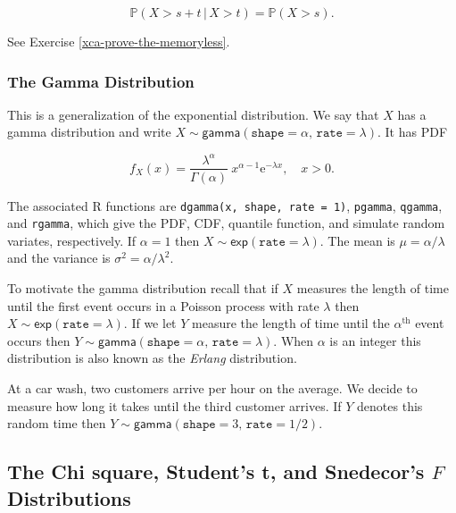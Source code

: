 \documentclass[]{book}
\numberwithin{equation}{chapter}
\numberwithin{figure}{chapter}
\theoremstyle{plain}
\theoremstyle{definition}
\theoremstyle{remark}
\theoremstyle{definition}
\theoremstyle{definition}
\theoremstyle{remark}
\let\BeginKnitrBlock\begin \let\EndKnitrBlock\end
\begin{document}
\begin{equation}
\mathbb{P}(X>s+t\,|\, X>t)=\mathbb{P}(X>s).
\end{equation}

See Exercise \ref{xca-prove-the-memoryless}.

\subsubsection{The Gamma Distribution}\label{sub-the-gamma-distribution}

This is a generalization of the exponential distribution. We say that
\(X\) has a gamma distribution and write
\(X\sim\mathsf{gamma}(\mathtt{shape}=\alpha,\,\mathtt{rate}=\lambda)\).
It has PDF

\begin{equation}
f_{X}(x)=\frac{\lambda^{\alpha}}{\Gamma(\alpha)}\: x^{\alpha-1}\mathrm{e}^{-\lambda x},\quad x>0.
\end{equation}

The associated R functions are \texttt{dgamma(x,\ shape,\ rate\ =\ 1)},
\texttt{pgamma}, \texttt{qgamma}, and \texttt{rgamma}, which give the
PDF, CDF, quantile function, and simulate random variates, respectively.
If \(\alpha=1\) then \(X\sim\mathsf{exp}(\mathtt{rate}=\lambda)\). The
mean is \(\mu=\alpha/\lambda\) and the variance is
\(\sigma^{2}=\alpha/\lambda^{2}\).

To motivate the gamma distribution recall that if \(X\) measures the
length of time until the first event occurs in a Poisson process with
rate \(\lambda\) then \(X\sim\mathsf{exp}(\mathtt{rate}=\lambda)\). If
we let \(Y\) measure the length of time until the
\(\alpha^{\mathrm{th}}\) event occurs then
\(Y\sim\mathsf{gamma}(\mathtt{shape}=\alpha,\,\mathtt{rate}=\lambda)\).
When \(\alpha\) is an integer this distribution is also known as the
\emph{Erlang} distribution.

\bigskip

\BeginKnitrBlock{example}
\protect\hypertarget{ex:unnamed-chunk-289}{}{\label{ex:unnamed-chunk-289}}At
a car wash, two customers arrive per hour on the average. We decide to
measure how long it takes until the third customer arrives. If \(Y\)
denotes this random time then
\(Y\sim\mathsf{gamma}(\mathtt{shape}=3,\,\mathtt{rate}=1/2)\).
\EndKnitrBlock{example}

\subsection{\texorpdfstring{The Chi square, Student's t, and Snedecor's
\(F\)
Distributions}{The Chi square, Student's t, and Snedecor's F Distributions}}\label{sub-the-chi-Square-t-f}
\end{document}
